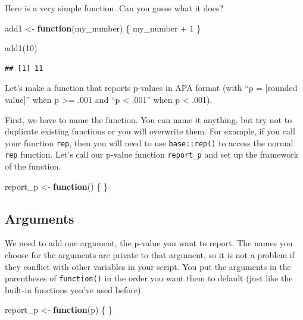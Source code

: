 \documentclass[
  oneside]{book}
\newenvironment{Shaded}{\begin{snugshade}}{\end{snugshade}}
\newcommand{\ControlFlowTok}[1]{\textcolor[rgb]{0.13,0.29,0.53}{\textbf{#1}}}
\newcommand{\DecValTok}[1]{\textcolor[rgb]{0.00,0.00,0.81}{#1}}
\newcommand{\FunctionTok}[1]{\textcolor[rgb]{0.00,0.00,0.00}{#1}}
\newcommand{\NormalTok}[1]{#1}
\newcommand{\OtherTok}[1]{\textcolor[rgb]{0.56,0.35,0.01}{#1}}
\newcommand{\SpecialCharTok}[1]{\textcolor[rgb]{0.00,0.00,0.00}{#1}}
\begin{document}
Here is a very simple function. Can you guess what it does?

\begin{Shaded}
\begin{Highlighting}[]
\NormalTok{add1 }\OtherTok{\textless{}{-}} \ControlFlowTok{function}\NormalTok{(my\_number) \{}
\NormalTok{  my\_number }\SpecialCharTok{+} \DecValTok{1}
\NormalTok{\}}

\FunctionTok{add1}\NormalTok{(}\DecValTok{10}\NormalTok{)}
\end{Highlighting}
\end{Shaded}

\begin{verbatim}
## [1] 11
\end{verbatim}

Let's make a function that reports p-values in APA format (with ``p = {[}rounded value{]}'' when p \textgreater= .001 and ``p \textless{} .001'' when p \textless{} .001).

First, we have to name the function. You can name it anything, but try not to duplicate existing functions or you will overwrite them. For example, if you call your function \texttt{rep}, then you will need to use \texttt{base::rep()} to access the normal \texttt{rep} function. Let's call our p-value function \texttt{report\_p} and set up the framework of the function.

\begin{Shaded}
\begin{Highlighting}[]
\NormalTok{report\_p }\OtherTok{\textless{}{-}} \ControlFlowTok{function}\NormalTok{() \{}
\NormalTok{\}}
\end{Highlighting}
\end{Shaded}

\hypertarget{arguments}{%
\subsection{Arguments}\label{arguments}}

We need to add one argument, the p-value you want to report. The names you choose for the arguments are private to that argument, so it is not a problem if they conflict with other variables in your script. You put the arguments in the parentheses of \texttt{function()} in the order you want them to default (just like the built-in functions you've used before).

\begin{Shaded}
\begin{Highlighting}[]
\NormalTok{report\_p }\OtherTok{\textless{}{-}} \ControlFlowTok{function}\NormalTok{(p) \{}
\NormalTok{\}}
\end{Highlighting}
\end{Shaded}
\end{document}
